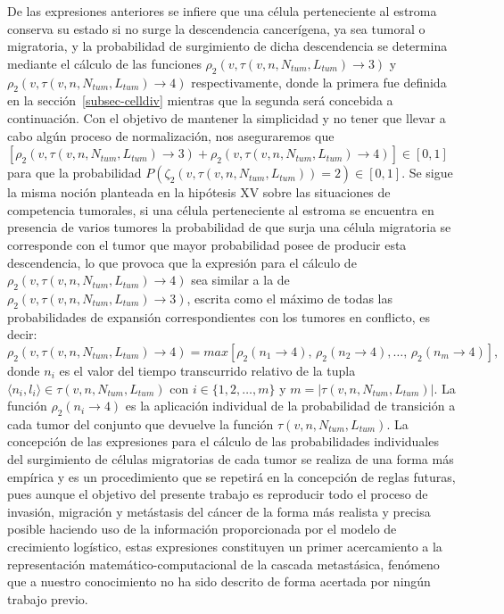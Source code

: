 De las expresiones anteriores se infiere que una c\'elula perteneciente al estroma conserva su estado si no surge la descendencia cancer\'igena, ya sea tumoral o migratoria, y la probabilidad de surgimiento de dicha descendencia se determina mediante el c\'alculo de las funciones $\rho_2(v,\tau(v,n,N_{tum},L_{tum}) \rightarrow 3)$ y $\rho_2(v,\tau(v,n,N_{tum},L_{tum}) \rightarrow 4)$ respectivamente, donde la primera fue definida en la secci\'on~\ref{subsec-celldiv} mientras que la segunda ser\'a concebida a continuaci\'on. Con el objetivo de mantener la simplicidad y no tener que llevar a cabo alg\'un proceso de normalizaci\'on, nos aseguraremos que $\left[\rho_2(v,\tau(v,n,N_{tum},L_{tum}) \rightarrow 3) + \rho_2(v,\tau(v,n,N_{tum},L_{tum}) \rightarrow 4)\right] \in [0,1]$ para que la probabilidad $P(\zeta_2(v,\tau(v,n,N_{tum},L_{tum}))=2) \in [0,1]$. Se sigue la misma noci\'on planteada en la hip\'otesis XV sobre las situaciones de competencia tumorales, si una c\'elula perteneciente al estroma se encuentra en presencia de varios tumores la probabilidad de que surja una c\'elula migratoria se corresponde con el tumor que mayor probabilidad posee de producir esta descendencia, lo que provoca que la expresi\'on para el c\'alculo de $\rho_2(v,\tau(v,n,N_{tum},L_{tum}) \rightarrow 4)$ sea similar a la de $\rho_2(v,\tau(v,n,N_{tum},L_{tum}) \rightarrow 3)$, escrita como el m\'aximo de todas las probabilidades de expansi\'on correspondientes con los tumores en conflicto, es decir:
\begin{equation}
\rho_2(v,\tau(v,n,N_{tum},L_{tum}) \rightarrow 4) = max\left[\rho_2(n_1 \rightarrow 4),\,\rho_2(n_2 \rightarrow 4),\ldots,\,\rho_2(n_m \rightarrow 4)\right], \label{eq-generaldivrule-migration}
\end{equation}
donde $n_i$ es el valor del tiempo transcurrido relativo de la tupla $\langle n_i, l_i \rangle \in \tau(v,n,N_{tum},L_{tum})$ con $i \in \lbrace 1,2,\ldots,m \rbrace$ y $m=|\tau(v,n,N_{tum},L_{tum})|$. La funci\'on $\rho_2(n_i \rightarrow 4)$ es la aplicaci\'on individual de la probabilidad de transici\'on a cada tumor del conjunto que devuelve la funci\'on $\tau(v,n,N_{tum},L_{tum})$. La concepci\'on de las expresiones para el c\'alculo de las probabilidades individuales del surgimiento de c\'elulas migratorias de cada tumor se realiza de una forma m\'as emp\'irica y es un procedimiento que se repetir\'a en la concepci\'on de reglas futuras, pues aunque el objetivo del presente trabajo es reproducir todo el proceso de invasi\'on, migraci\'on y met\'astasis del c\'ancer de la forma m\'as realista y precisa posible haciendo uso de la informaci\'on proporcionada por el modelo de crecimiento log\'istico, estas expresiones constituyen un primer acercamiento a la representaci\'on matem\'atico-computacional de la cascada metast\'asica, fen\'omeno que a nuestro conocimiento no ha sido descrito de forma acertada por ning\'un trabajo previo.

